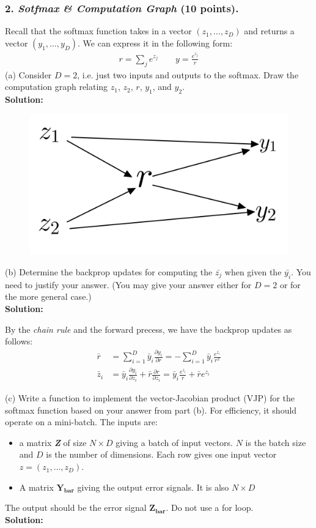 \documentclass[12pt]{article}%
\newcommand{\PARTIAL}[2]{\frac{\partial #1}{\partial #2}}
\begin{document}
\pagebreak

\subsubsection*{2. \textit{Sotfmax \& Computation Graph} (10 points).}
Recall that the softmax function takes in a vector $(z_1, \dots , z_D)$ and returns a
vector $(y_1, \dots , y_D)$. We can express it in the following form:
\begin{equation*}
    \begin{split}
    r = \sum_j e^{z_j}   \qquad y = \frac{e^{z_j}}{r}
\end{split}
\end{equation*}
(a) Consider $D = 2$, i.e. just two inputs and outputs to the softmax. Draw the
computation graph relating $z_1$, $z_2$, $r$, $y_1$, and $y_2$.
\vspace{1em}\\
{\bf Solution:}
\begin{figure}[h]
    \begin{center}
        \includegraphics[width=0.5\columnwidth]{img/Q2(a).jpeg}        
    \end{center}
\end{figure}


(b) Determine the backprop updates for computing the $\bar{z_j}$ when given the $\bar{y_i}$.
You need to justify your answer. (You may give your answer either for
$D = 2$ or for the more general case.)\\
{\bf Solution:}
\par By the {\it chain rule} and the forward precess, we have the backprop updates as follows:
\begin{align*}
    \bar{r} &= \sum_{i=1}^D \bar{y}_i \PARTIAL{y_i}{r} = -\sum_{i=1}^D\bar{y}_i\frac{e^{z_i}}{r^2}\\
    \bar{z}_i &= \bar{y}_i\PARTIAL{y_i}{z_i} + \bar{r}\PARTIAL{r}{z_i} = \bar{y}_i\frac{e^{z_i}}{r} + \bar{r}e^{z_i}
\end{align*}

(c) Write a function to implement the vector-Jacobian product (VJP) for the
softmax function based on your answer from part (b). For efficiency, it should
operate on a mini-batch.
The inputs are:
\begin{itemize}
    \item a matrix \textit{\textbf{Z}} of size $N \times D$ giving a batch of input vectors. $N$ is the batch
size and $D$ is the number of dimensions. Each row gives one input vector
$z = (z_1, \dots , z_D)$.
    \item A matrix $\mathbf{Y_{bar}}$ giving the output error signals. It is also $N \times D$
\end{itemize} 
\indent The output should be the error signal $\mathbf{Z_{bar}}$. Do not use a for loop.\\
{\bf Solution:}
\end{document}
